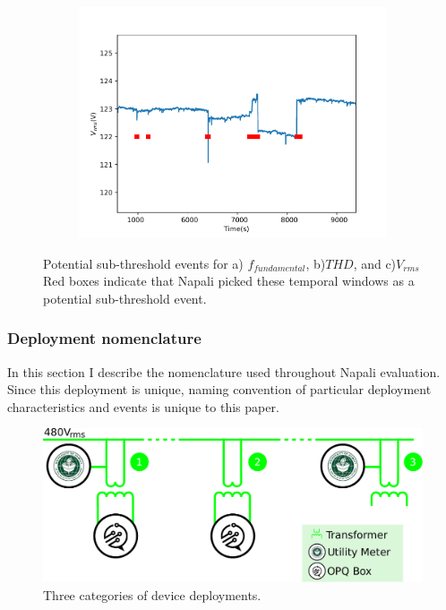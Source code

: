 \begin{figure}[ht!]
    \begin{subfigure}{0.5\textwidth}
        \centering
        \includegraphics[width=1\linewidth]{img/napali_eval/napali_live_rms.pdf}
        \caption{}
        \label{fig:expdes:7:3}
    \end{subfigure}

    \caption{Potential sub-threshold events for a) $f_{fundamental}$, b)$THD$, and c)$V_{rms}$
    Red boxes indicate that Napali picked these temporal windows as a potential sub-threshold event.}
    \label{fig:expdes:7}
\end{figure}

\subsubsection{Deployment nomenclature}\label{subsec:deploynment-nomenclature}
In this section I describe the nomenclature used throughout Napali evaluation.
Since this deployment is unique, naming convention of particular deployment characteristics and events is unique to this paper.

\begin{figure}[ht!]
    \centering
    \includegraphics[width=1\linewidth]{img/deployment/meter_types.pdf}
    \caption{Three categories of device deployments.}
    \label{fig:expdes:nomenclature}
\end{figure}

